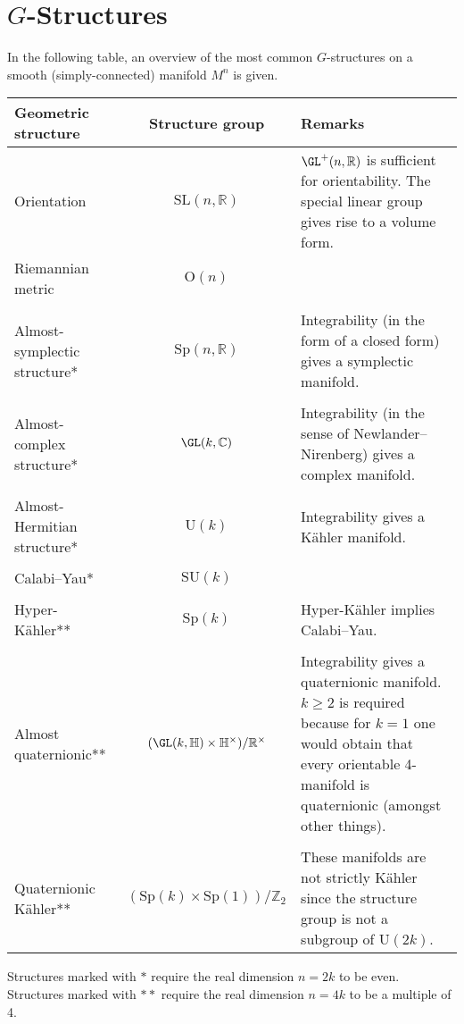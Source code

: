 \chapter{\texorpdfstring{$G$-Structures}{G-Structures}}
    \setcounter{section}{1}

    In the following table, an overview of the most common $G$-structures on a smooth (simply-connected) manifold $M^n$ is given.
    \begin{center}
        \begin{tabularx}{\textwidth}{|l|c|X|}
             \hline
                 Geometric structure&Structure group&Remarks\\
             \hline
                 Orientation&$\mathrm{SL}(n,\mathbb{R})$&$\GL^+(n,\mathbb{R})$ is sufficient for orientability. The special linear group gives rise to a volume form.\\
                 Riemannian metric&$\mathrm{O}(n)$&\\&&\\
                 Almost-symplectic structure*&$\mathrm{Sp}(n,\mathbb{R})$&Integrability (in the form of a closed form) gives a symplectic manifold.\\&&\\
                 Almost-complex structure*&$\GL(k,\mathbb{C})$&Integrability (in the sense of Newlander--Nirenberg) gives a complex manifold.\\&&\\
                 Almost-Hermitian structure*&$\mathrm{U}(k)$&Integrability gives a K\"ahler manifold.\\&&\\
                 Calabi--Yau*&$\mathrm{SU}(k)$&\\&&\\
                 Hyper-K\"ahler**&$\mathrm{Sp}(k)$&Hyper-K\"ahler implies Calabi--Yau.\\&&\\
                 Almost quaternionic**&$(\GL(k,\mathbb{H})\times\mathbb{H}^\times)/\mathbb{R}^\times$&Integrability gives a quaternionic manifold. $k\geq2$ is required because for $k=1$ one would obtain that every orientable 4-manifold is quaternionic (amongst other things).\\&&\\
                 Quaternionic K\"ahler**&$(\mathrm{Sp}(k)\times\mathrm{Sp}(1))/\mathbb{Z}_2$&These manifolds are not strictly K\"ahler since the structure group is not a subgroup of $\mathrm{U}(2k)$.\\
             \hline
        \end{tabularx}
    \end{center}
    Structures marked with $\ast$ require the real dimension $n=2k$ to be even. Structures marked with $\ast\ast$ require the real dimension $n=4k$ to be a multiple of 4.

